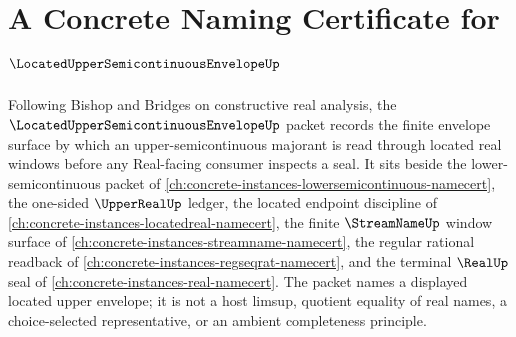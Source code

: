 \chapter{A Concrete Naming Certificate for $\LocatedUpperSemicontinuousEnvelopeUp$}
\label{ch:concrete-instances-located-upper-semicontinuous-envelope-namecert}

Following Bishop and Bridges on constructive real analysis, the
$\LocatedUpperSemicontinuousEnvelopeUp$ packet records the finite envelope
surface by which an upper-semicontinuous majorant is read through located
real windows before any Real-facing consumer inspects a seal. It sits beside
the lower-semicontinuous packet of
\autoref{ch:concrete-instances-lowersemicontinuous-namecert}, the one-sided
$\UpperRealUp$ ledger, the located endpoint discipline of
\autoref{ch:concrete-instances-locatedreal-namecert}, the finite
$\StreamNameUp$ window surface of
\autoref{ch:concrete-instances-streamname-namecert}, the regular rational
readback of \autoref{ch:concrete-instances-regseqrat-namecert}, and the
terminal $\RealUp$ seal of \autoref{ch:concrete-instances-real-namecert}.
The packet names a displayed located upper envelope; it is not a host
limsup, quotient equality of real names, a choice-selected representative, or
an ambient completeness principle.


